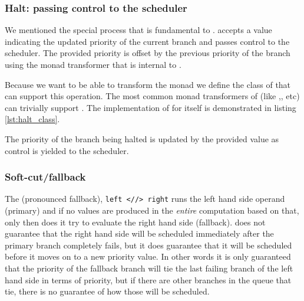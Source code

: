 \subsubsection{Halt: passing control to the scheduler}

We mentioned the special  process that is fundamental to .
 accepts a value indicating the updated
priority of the current branch and passes control to the scheduler. The provided priority is offset by the previous
priority of the branch using the  monad transformer that is internal to .

Because we want to be able to transform the  monad we define the class of
 that can support this operation. The most common monad
transformers of  (like ,, etc)
can trivially support . The implementation of 
for  itself is demonstrated in listing
\ref{lst:halt_class}.

\begin{code}
  \caption{\label{lst:halt_class}The
    priority of the branch being halted is updated
    by the provided value as control is yielded to the scheduler.}
\end{code}


\subsubsection{Soft-cut/fallback}

The \hask{<//>} (pronounced fallback), \texttt{left <//> right} runs
the left hand side operand (primary) and if no values are produced in
the \emph{entire} computation based on that, only then does it try to
evaluate the right hand side (fallback).  does not
guarantee that the right hand side will be scheduled immediately after
the primary branch completely fails, but it does guarantee that it
will be scheduled before it moves on to a new priority value. In other
words it is only guaranteed that the priority of the fallback branch
will tie the last failing branch of the left hand side in terms of
priority, but if there are other branches in the queue that tie, there
is no guarantee of how those will be scheduled.

